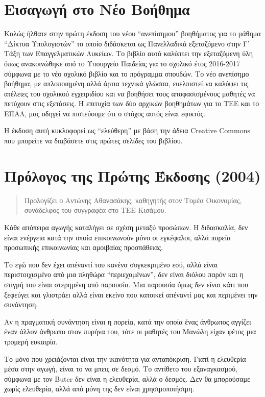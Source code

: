 \section*{Εισαγωγή στο Νέο Βοήθημα}
Καλώς ήλθατε στην πρώτη έκδοση του νέου ``ανεπίσημου'' βοηθήματος για το
μάθημα ``Δίκτυα Υπολογιστών'' το οποίο διδάσκεται ως
Πανελλαδικά εξεταζόμενο στην Γ' Τάξη των Επαγγελματικών Λυκείων.  Το βιβλίο
αυτό καλύπτει την εξεταζόμενη ύλη όπως ανακοινώθηκε από το Υπουργείο Παιδείας
για το σχολικό έτος 2016-2017 σύμφωνα με το νέο σχολικό βιβλίο και το πρόγραμμα
σπουδών.  Το νέο ανεπίσημο βοήθημα, με απλοποιημένη
αλλά άρτια τεχνικά γλώσσα, ευελπιστεί να καλύψει τις ατέλειες του σχολικού
εγχειριδίου και να βοηθήσει τους αποφασισμένους μαθητές να πετύχουν στις
εξετάσεις. Η επιτυχία των δύο αρχικών βοηθημάτων για το ΤΕΕ και το ΕΠΑΛ,
μας οδηγεί να πιστεύουμε ότι ο στόχος αυτός είναι εφικτός.

Η έκδοση αυτή κυκλοφορεί ως ``ελεύθερη'' με βάση την άδεια Creative Commons
που μπορείτε να διαβάσετε στις πρώτες σελίδες του βιβλίου.

\section*{Πρόλογος της  Πρώτης Έκδοσης (2004)} 
\begin{quote}
Προλογίζει ο Αντώνης Αθανασάκης, καθηγητής στον Τομέα Οικονομίας, συνάδελφος του συγγραφέα στο ΤΕΕ Κισάμου.
\end{quote}
Κάθε απόπειρα αγωγής καταλήγει σε σχέση μεταξύ προσώπων. Η διδασκαλία, δεν είναι ενέργεια κατά την οποία επικοινωνούν μόνο οι εγκέφαλοι, αλλά πορεία προσωπικής επικοινωνίας και αμοιβαίας προσπάθειας. 

Το εγώ που δεν έχει απέναντί του κανένα συγκεκριμένο εσύ, αλλά είναι περιστοιχισμένο από μια πληθώρα ``περιεχομένων'', δεν είναι διόλου παρόν και η στιγμή του είναι στερημένη από παρουσία. Μια παρουσία όμως δεν είναι κάτι που ξεφεύγει και γλιστράει αλλά είναι εκείνο που κατοικεί απέναντί μας και περιμένει την συνάντηση. 

Αν η πραγματική συνάντηση είναι η πορεία, κατά την οποία ένας άνθρωπος αγγίζει έναν άλλον άνθρωπο στον πυρήνα του, τότε οι μαθητές του Μανώλη είχαν φέτος μια τρομερή ευκαιρία.

Το μόνο που χρειάζονται είναι την ικανότητα για ανταπόκριση. Γιατί η ελευθερία μέσα στην αγωγή, είναι το να μπεις σε δεσμό. Το αντίθετο του εξαναγκασμού, σύμφωνα με τον Buter δεν είναι η ελευθερία, αλλά ο δεσμός. Δεν θα μπορούσαμε χωρίς ελευθερία, αλλά από μόνη της δεν είναι χρησιμοποιήσιμη.
\newpage
\tableofcontents
\listoffigures

